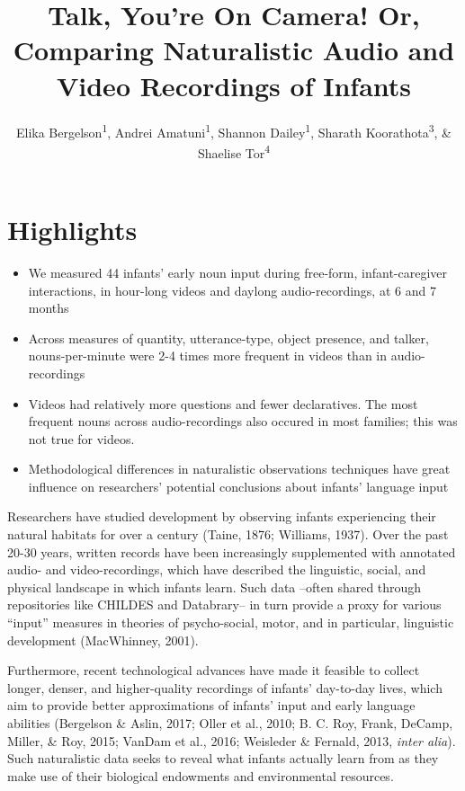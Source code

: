 \documentclass[floatsintext,man]{apa6}
\title{Talk, You're On Camera! Or, Comparing Naturalistic Audio and Video
Recordings of Infants}
\author{Elika Bergelson\textsuperscript{1}, Andrei Amatuni\textsuperscript{1}, Shannon Dailey\textsuperscript{1}, Sharath Koorathota\textsuperscript{3}, \& Shaelise Tor\textsuperscript{4}}
\affiliation{
    \vspace{0.5cm}
          \textsuperscript{1} Duke University\\
          \textsuperscript{2} University of Rochester\\
          \textsuperscript{3} Columbia University Medical Center\\
          \textsuperscript{4} Syracuse University  }
\providecommand{\tightlist}{%
  \setlength{\itemsep}{0pt}\setlength{\parskip}{0pt}}
\theoremstyle{definition}
\theoremstyle{definition}
\theoremstyle{definition}
\theoremstyle{remark}
\begin{document}
\maketitle

\setcounter{secnumdepth}{0}



\section{Highlights}\label{highlights}

\begin{itemize}
\tightlist
\item
  We measured 44 infants' early noun input during free-form,
  infant-caregiver interactions, in hour-long videos and daylong
  audio-recordings, at 6 and 7 months
\item
  Across measures of quantity, utterance-type, object presence, and
  talker, nouns-per-minute were 2-4 times more frequent in videos than
  in audio-recordings
\item
  Videos had relatively more questions and fewer declaratives. The most
  frequent nouns across audio-recordings also occured in most families;
  this was not true for videos.
\item
  Methodological differences in naturalistic observations techniques
  have great influence on researchers' potential conclusions about
  infants' language input
\end{itemize}

Researchers have studied development by observing infants experiencing
their natural habitats for over a century (Taine, 1876; Williams, 1937).
Over the past 20-30 years, written records have been increasingly
supplemented with annotated audio- and video-recordings, which have
described the linguistic, social, and physical landscape in which
infants learn. Such data --often shared through repositories like
CHILDES and Databrary-- in turn provide a proxy for various
\enquote{input} measures in theories of psycho-social, motor, and in
particular, linguistic development (MacWhinney, 2001).

Furthermore, recent technological advances have made it feasible to
collect longer, denser, and higher-quality recordings of infants'
day-to-day lives, which aim to provide better approximations of infants'
input and early language abilities (Bergelson \& Aslin, 2017; Oller et
al., 2010; B. C. Roy, Frank, DeCamp, Miller, \& Roy, 2015; VanDam et
al., 2016; Weisleder \& Fernald, 2013, \emph{inter alia}). Such
naturalistic data seeks to reveal what infants actually learn from as
they make use of their biological endowments and environmental
resources.
\end{document}

